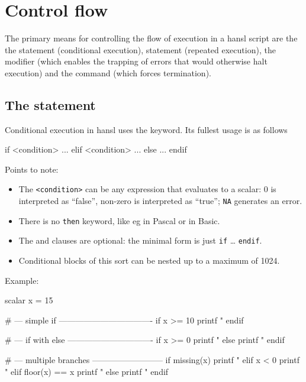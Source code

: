 \chapter{Control flow}
\label{chap:hp-ctrlflow}

The primary means for controlling the flow of execution in a hansl
script are the the  statement (conditional execution),
 statement (repeated execution), the  modifier
(which enables the trapping of errors that would otherwise halt
execution) and the  command (which forces termination).

\section{The  statement}

Conditional execution in hansl uses the  keyword. Its fullest
usage is as follows
\begin{code}
if <condition>
   ...
elif <condition>
   ...
else 
   ...
endif  
\end{code}

Points to note:
\begin{itemize}
\item The \texttt{<condition>} can be any expression that evaluates to a
  scalar: 0 is interpreted as ``false'', non-zero is interpreted as
  ``true''; \texttt{NA} generates an error.
\item There is no \texttt{then} keyword, like eg in Pascal or in Basic.
\item The  and  clauses are optional: the minimal
  form is just \texttt{if} \dots{} \texttt{endif}.
\item Conditional blocks of this sort can be nested up to a maximum of
  1024.
\end{itemize}

Example:
\begin{code}
scalar x = 15

# --- simple if ----------------------------------
if x >= 10
   printf "%
endif

# --- if with else -------------------------------
if x >= 0
   printf "%
else
   printf "%
endif

# --- multiple branches --------------------------
if missing(x)
   printf "%
elif x < 0
   printf "%
elif floor(x) == x
   printf "%
else
   printf "%
endif
\end{code}


